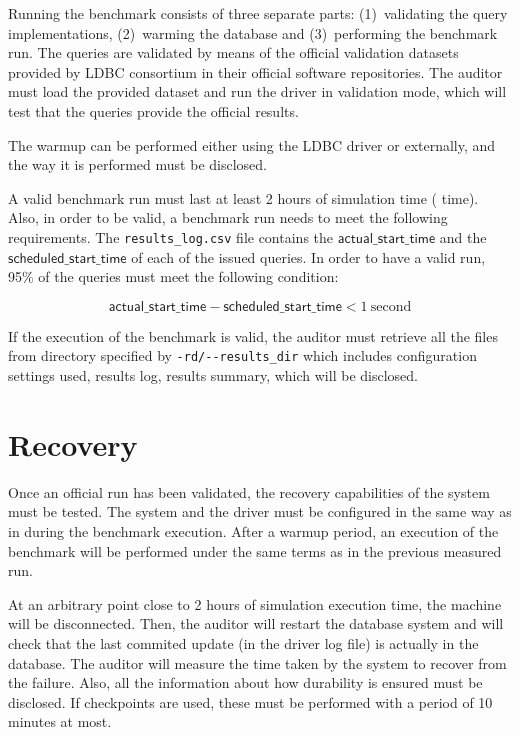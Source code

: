 Running the benchmark consists of three separate parts: (1)~validating the query
implementations, (2)~warming the database and (3)~performing the benchmark run. The
queries are validated by means of the official validation datasets provided by
LDBC consortium in their official software repositories. The auditor must load
the provided dataset and run the driver in validation mode, which will test
that the queries provide the official results.

The warmup can be performed either using the LDBC driver or externally, and the
way it is performed must be disclosed.

A valid benchmark run must last at least 2 hours of simulation time (\datagen
time).  Also, in order to be valid, a benchmark run needs to meet the following
requirements. The \texttt{results\_log.csv} file contains the $\mathsf{actual\_start\_time}$ and the $\mathsf{scheduled\_start\_time}$ of each of the issued queries.  In order to have a valid
run, 95\% of the queries must meet the following condition:

\begin{equation*}
\mathsf{actual\_start\_time} - \mathsf{scheduled\_start\_time} < 1\
\mathrm{second}
\end{equation*}

If the execution of the benchmark is valid, the auditor must retrieve all the
files from directory specified by \verb|-rd/--results_dir| which includes
configuration settings used, results log, results summary, which will be
disclosed.


\section{Recovery}

Once an official run has been validated, the recovery capabilities of the
system must be tested. The system and the driver must be configured in the
same way as in during the benchmark execution. After a warmup period, an
execution of the benchmark will be performed under the same terms as in the
previous measured run.

At an arbitrary point close to 2 hours of simulation execution time, the machine
will be disconnected.  Then, the auditor will restart the database system and
will check that the last commited update (in the driver log file) is actually
in the database. The auditor will measure the time taken by the system to
recover from the failure. Also, all the information about how durability is
ensured must be disclosed. If checkpoints are used, these must be performed
with a period of 10 minutes at most.

